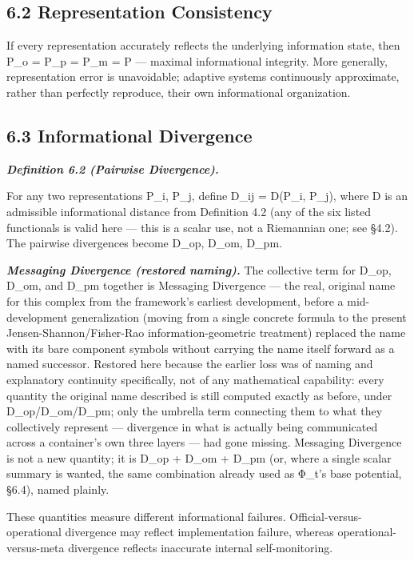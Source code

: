 \documentclass[
]{article}
\begin{document}
\hypertarget{representation-consistency}{%
\subsection{6.2 Representation
Consistency}\label{representation-consistency}}

If every representation accurately reflects the underlying information
state, then P\_o = P\_p = P\_m = P --- maximal informational integrity.
More generally, representation error is unavoidable; adaptive systems
continuously approximate, rather than perfectly reproduce, their own
informational organization.

\hypertarget{informational-divergence}{%
\subsection{6.3 Informational
Divergence}\label{informational-divergence}}

\emph{\textbf{Definition 6.2 (Pairwise Divergence).}}

For any two representations P\_i, P\_j, define D\_ij = D(P\_i, P\_j),
where D is an admissible informational distance from Definition 4.2 (any
of the six listed functionals is valid here --- this is a scalar use,
not a Riemannian one; see §4.2). The pairwise divergences become D\_op,
D\_om, D\_pm.

\emph{\textbf{Messaging Divergence (restored naming).}} The collective
term for D\_op, D\_om, and D\_pm together is Messaging Divergence ---
the real, original name for this complex from the framework's earliest
development, before a mid-development generalization (moving from a
single concrete formula to the present Jensen-Shannon/Fisher-Rao
information-geometric treatment) replaced the name with its bare
component symbols without carrying the name itself forward as a named
successor. Restored here because the earlier loss was of naming and
explanatory continuity specifically, not of any mathematical capability:
every quantity the original name described is still computed exactly as
before, under D\_op/D\_om/D\_pm; only the umbrella term connecting them
to what they collectively represent --- divergence in what is actually
being communicated across a container's own three layers --- had gone
missing. Messaging Divergence is not a new quantity; it is D\_op + D\_om
+ D\_pm (or, where a single scalar summary is wanted, the same
combination already used as Φ\_t's base potential, §6.4), named plainly.

These quantities measure different informational failures.
Official-versus-operational divergence may reflect implementation
failure, whereas operational-versus-meta divergence reflects inaccurate
internal self-monitoring.
\end{document}
